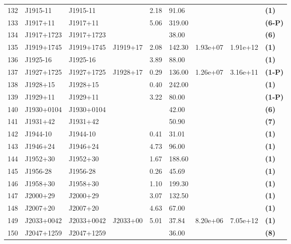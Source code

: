 \documentclass{jaa}
\begin{document}
\begin{table*}
\begin{minipage}{0.95\textwidth}
\begin{tabular}{|l|l|l|l|l|l|l|l|l|}
 132 & J1915-11    & J1915-11    &             &  2.18 &  91.06 &            &          &  {\bf (1)}   \\
 133 & J1917+11    & J1917+11	 &             &  5.06 & 319.00 &            &          &  {\bf (6-P)} \\
 134 & J1917+1723  & J1917+1723  &             &       &  38.00 &            &          &  {\bf (6)}   \\
 135 & J1919+1745  & J1919+1745  &  J1919+17   &  2.08 & 142.30 &  1.93e+07  & 1.91e+12 &  {\bf (1)}   \\
 136 & J1925-16    & J1925-16    &             &  3.89 &  88.00 &            &          &  {\bf (1)}   \\ 
 137 & J1927+1725  & J1927+1725  &  J1928+17   &  0.29 & 136.00 &  1.26e+07  & 3.16e+11 &  {\bf (1-P)} \\ 
 138 & J1928+15    & J1928+15    &             &  0.40 & 242.00 &            &          &  {\bf (1)}   \\
 139 & J1929+11    & J1929+11    &             &  3.22 &  80.00 &            &          &  {\bf (1-P)} \\
 140 & J1930+0104  & J1930+0104  &             &       &  42.00 &            &          &  {\bf (6)}   \\
 141 & J1931+42    & J1931+42    &             &       &  50.90 &            &          &  {\bf (7)}   \\
 142 & J1944-10    & J1944-10    &             &  0.41 &  31.01 &            &          &  {\bf (1)}   \\
 143 & J1946+24    & J1946+24    &             &  4.73 &  96.00 &            &          &  {\bf (1)}   \\
 144 & J1952+30    & J1952+30    &             &  1.67 & 188.60 &            &          &  {\bf (1)}   \\
 145 & J1956-28    & J1956-28    &             &  0.26 &  45.69 &            &          &  {\bf (1)}   \\
 146 & J1958+30    & J1958+30    &             &  1.10 & 199.30 &            &          &  {\bf (1)}   \\
 147 & J2000+29    & J2000+29    &             &  3.07 & 132.50 &            &          &  {\bf (1)}   \\
 148 & J2007+20    & J2007+20    &             &  4.63 &  67.00 &            &          &  {\bf (1)}   \\
 149 & J2033+0042  & J2033+0042  &  J2033+00   &  5.01 &  37.84 &  8.20e+06  & 7.05e+12 &  {\bf (1)}   \\
 150 & J2047+1259  & J2047+1259  &             &       &  36.00 &            &          &  {\bf (8)}   \\ \bottomrule
\end{tabular}
%
\end{minipage}
%
\label{t_rrat3}
%
\end{table*}
%
\end{document}
